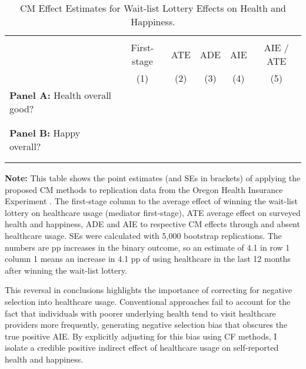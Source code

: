 \begin{table}[h!]
    \singlespacing
    \centering
    \small
    \caption{CM Effect Estimates for Wait-list Lottery Effects on Health and Happiness.}
    \begin{tabular}{l c c c c c}
        \\[-1.8ex]\hline \hline \\[-1.8ex] 
        & First-stage & ATE & ADE & AIE & AIE / ATE \\
        \cmidrule(lr){2-6}
        & (1) & (2) & (3) & (4) & (5) \\
        \midrule
        \multicolumn{1}{l}{\textbf{Panel A:} Health overall good?} \\
        
        \\[-1.8ex]\hline \\[-1.8ex]
        \multicolumn{1}{l}{\textbf{Panel B:} Happy overall?} \\
        
        \\[-1.8ex]\hline \\[-1.8ex]
    \end{tabular}
    \vspace{-0.125cm}
    \label{tab:cm-oregon}
    \justify
    \footnotesize
    \textbf{Note:}
    This table shows the point estimates (and SEs in brackets) of applying the proposed CM methods to replication data from the Oregon Health Insurance Experiment \citep{icspr2014oregon}.
    The first-stage column to the average effect of winning the wait-list lottery on healthcare usage (mediator first-stage), ATE average effect on surveyed health and happiness, ADE and AIE to respective CM effects through and absent healthcare usage.
    SEs were calculated with 5,000 bootstrap replications.
    The numbers are pp increases in the binary outcome, so an estimate of 4.1 in row 1 column 1 means an increase in 4.1 pp of using healthcare in the last 12 months after winning the wait-list lottery.
\end{table}

This reversal in conclusions highlights the importance of correcting for negative selection into healthcare usage.
Conventional approaches fail to account for the fact that individuals with poorer underlying health tend to visit healthcare providers more frequently, generating negative selection bias that obscures the true positive AIE.
By explicitly adjusting for this bias using CF methods, I isolate a credible positive indirect effect of healthcare usage on self-reported health and happiness.

